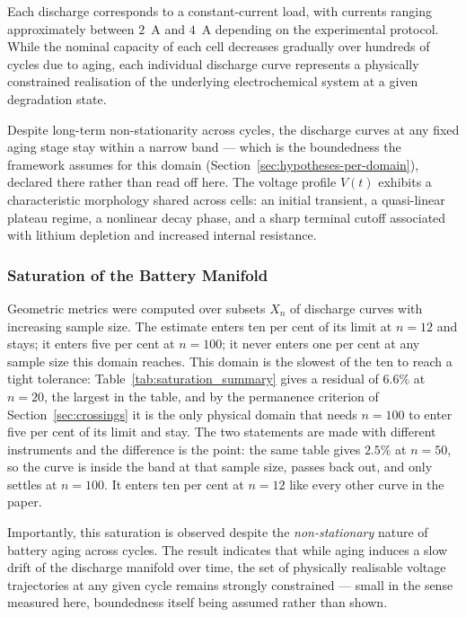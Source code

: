 \documentclass[10pt]{article}
\theoremstyle{plain}
\theoremstyle{definition}
\theoremstyle{remark}
\begin{document}
Each discharge corresponds to a constant-current load, with currents ranging
approximately between $2$~A and $4$~A depending on the experimental protocol.
While the nominal capacity of each cell decreases gradually over hundreds of
cycles due to aging, each individual discharge curve represents a physically
constrained realisation of the underlying electrochemical system at a given
degradation state.

Despite long-term non-stationarity across cycles, the discharge curves at any
fixed aging stage stay within a narrow band --- which is the boundedness the
framework assumes for this domain (Section~\ref{sec:hypotheses-per-domain}),
declared there rather than read off here. The voltage profile $V(t)$
exhibits a characteristic morphology shared across cells: an initial transient,
a quasi-linear plateau regime, a nonlinear decay phase, and a sharp terminal
cutoff associated with lithium depletion and increased internal resistance.

\subsubsection{Saturation of the Battery Manifold}

Geometric metrics were computed over subsets $X_n$ of discharge curves with
increasing sample size. The estimate enters ten per cent of its limit at $n=12$
and stays; it enters five per cent at $n=100$; it never enters one per cent at
any sample size this domain reaches.
This domain is the slowest of the ten to reach a tight tolerance:
Table~\ref{tab:saturation_summary} gives a residual of $6.6\%$ at $n=20$, the
largest in the table, and by the permanence criterion of
Section~\ref{sec:crossings} it is the only physical domain that needs $n=100$
to enter five per cent of its limit and stay. The two statements are made with
different instruments and the difference is the point: the same table gives
$2.5\%$ at $n=50$, so the curve is inside the band at that sample size, passes
back out, and only settles at $n=100$. It enters ten per cent at $n=12$ like
every other curve in the paper.



Importantly, this saturation is observed despite the \emph{non-stationary} nature
of battery aging across cycles. The result indicates that while aging induces a
slow drift of the discharge manifold over time, the set of physically realisable
voltage trajectories at any given cycle remains strongly constrained --- small
in the sense measured here, boundedness itself being assumed rather than shown.
\end{document}
